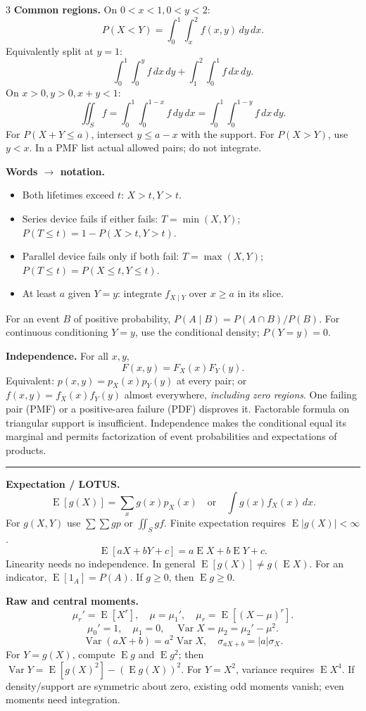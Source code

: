 \documentclass[letterpaper,landscape]{article}
\DeclareMathOperator{\E}{E}
\DeclareMathOperator{\Var}{Var}
\newcommand{\dd}{\,d}
\newcommand{\head}[1]{\vspace{3pt}{\color{navy}\bfseries\fontsize{10}{11}\selectfont #1}\par\vspace{1pt}\hrule\vspace{3pt}}
\newcommand{\mini}[1]{{\bfseries #1}}
\begin{document}
\begin{multicols*}{3}
\mini{Common regions.} On $0<x<1,0<y<2$:
\[
 P(X<Y)=\int_0^1\int_x^2 f(x,y)\dd y\dd x.
\]
Equivalently split at $y=1$:
\[
 \int_0^1\int_0^y f\dd x\dd y+
 \int_1^2\int_0^1 f\dd x\dd y.
\]
On $x>0,y>0,x+y<1$:
\[
 \iint_S f=\int_0^1\int_0^{1-x}f\dd y\dd x
 =\int_0^1\int_0^{1-y}f\dd x\dd y.
\]
For $P(X+Y\le a)$, intersect $y\le a-x$ with the support. For $P(X>Y)$, use $y<x$. In a PMF list actual allowed pairs; do not integrate.

\mini{Words $\to$ notation.}
\begin{itemize}[leftmargin=10pt,itemsep=1pt,topsep=1pt]
\item Both lifetimes exceed $t$: $X>t,Y>t$.
\item Series device fails if either fails:
$T=\min(X,Y)$; $P(T\le t)=1-P(X>t,Y>t)$.
\item Parallel device fails only if both fail:
$T=\max(X,Y)$; $P(T\le t)=P(X\le t,Y\le t)$.
\item At least $a$ given $Y=y$: integrate $f_{X\mid Y}$ over $x\ge a$ in its slice.
\end{itemize}
For an event $B$ of positive probability,
$P(A\mid B)=P(A\cap B)/P(B)$.
For continuous conditioning $Y=y$, use the conditional density; $P(Y=y)=0$.

\mini{Independence.} For all $x,y$,
\[
 F(x,y)=F_X(x)F_Y(y).
\]
Equivalent: $p(x,y)=p_X(x)p_Y(y)$ at every pair; or $f(x,y)=f_X(x)f_Y(y)$ almost everywhere, \emph{including zero regions}. One failing pair (PMF) or a positive-area failure (PDF) disproves it. Factorable formula on triangular support is insufficient. Independence makes the conditional equal its marginal and permits factorization of event probabilities and expectations of products.

\columnbreak
\head{3\quad Expectation, moments, MGFs}
\mini{Expectation / LOTUS.}
\[
\E[g(X)]=\sum_x g(x)p_X(x)
\quad\text{or}\quad\int g(x)f_X(x)\dd x.
\]
For $g(X,Y)$ use $\sum\sum g p$ or $\iint_S g f$.
Finite expectation requires $\E|g(X)|<\infty$.
\[
\E[aX+bY+c]=a\E X+b\E Y+c.
\]
Linearity needs no independence. In general $\E[g(X)]\ne g(\E X)$. For an indicator, $\E[1_A]=P(A)$. If $g\ge0$, then $\E g\ge0$.

\mini{Raw and central moments.}
\[
 \mu_r'=\E[X^r],\quad\mu=\mu_1',\quad
 \mu_r=\E[(X-\mu)^r].
\]
\[
 \mu_0'=1,\quad\mu_1=0,\quad
 \Var X=\mu_2=\mu_2'-\mu^2.
\]
\[
 \Var(aX+b)=a^2\Var X,\quad
 \sigma_{aX+b}=|a|\sigma_X.
\]
For $Y=g(X)$, compute $\E g$ and $\E g^2$; then
$\Var Y=\E[g(X)^2]-(\E g(X))^2$.
For $Y=X^2$, variance requires $\E X^4$.
If density/support are symmetric about zero, existing odd moments vanish; even moments need integration.


\end{multicols*}
\end{document}
